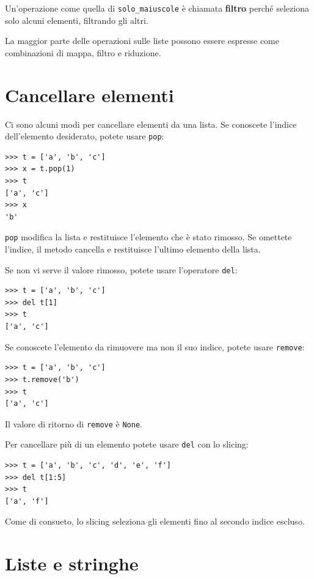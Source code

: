 \documentclass[10pt]{book}
\begin{document}
Un'operazione come quella di \verb"solo_maiuscole" è chiamata {\bf filtro} perché seleziona solo alcuni elementi, filtrando gli altri.

La maggior parte delle operazioni sulle liste possono essere espresse come combinazioni di mappa, filtro e riduzione.

\section{Cancellare elementi}

Ci sono alcuni modi per cancellare elementi da una lista. Se conoscete l'indice dell'elemento desiderato, potete usare
{\tt pop}:

\begin{verbatim}
>>> t = ['a', 'b', 'c']
>>> x = t.pop(1)
>>> t
['a', 'c']
>>> x
'b'
\end{verbatim}
%
{\tt pop} modifica la lista e restituisce l'elemento che è stato rimosso. Se omettete l'indice, il metodo cancella e restituisce l'ultimo elemento della lista.

Se non vi serve il valore rimosso, potete usare l'operatore {\tt del}:

\begin{verbatim}
>>> t = ['a', 'b', 'c']
>>> del t[1]
>>> t
['a', 'c']
\end{verbatim}
%

Se conoscete l'elemento da rimuovere ma non il suo indice, potete usare {\tt remove}:

\begin{verbatim}
>>> t = ['a', 'b', 'c']
>>> t.remove('b')
>>> t
['a', 'c']
\end{verbatim}
%
Il valore di ritorno di {\tt remove} è {\tt None}.

Per cancellare più di un elemento potete usare {\tt del} con lo slicing:

\begin{verbatim}
>>> t = ['a', 'b', 'c', 'd', 'e', 'f']
>>> del t[1:5]
>>> t
['a', 'f']
\end{verbatim}
%
Come di consueto, lo slicing seleziona gli elementi fino al secondo indice escluso.

\section{Liste e stringhe}
\end{document}
